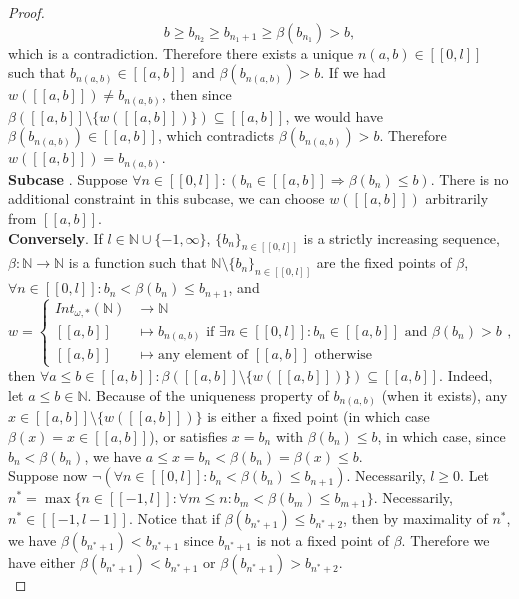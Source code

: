 \documentclass[a4paper,11pt]{article}
\newcommand*\circled[1]{\tikz[baseline=(char.base)]{
            \node[shape=circle,draw,inner sep=2pt] (char) {#1};}}
\theoremstyle{plain}
\theoremstyle{definition}
\theoremstyle{remark}
\begin{document}
\begin{proof}
\[ b \geq b_{n_2} \geq b_{n_1 + 1} \geq \beta(b_{n_1}) > b, \]
which is a contradiction. Therefore there exists a unique $n(a,b) \in [\![0,l]\!]$ such that $b_{n(a,b)} \in [\![a,b]\!] \text{ and } \beta(b_{n(a,b)}) > b$. If we had $w([\![a,b]\!]) \neq b_{n(a,b)}$, then since $\beta([\![a,b]\!]\setminus \{w([\![a,b]\!])\}) \subseteq [\![a,b]\!]$, we would have $\beta(b_{n(a,b)}) \in [\![a,b]\!]$, which contradicts $\beta(b_{n(a,b)}) > b$. Therefore $w([\![a,b]\!]) = b_{n(a,b)}$. \\
\textbf{Subcase \circled{1.2}}. Suppose $\forall n \in [\![0,l]\!] : (b_n \in [\![a,b]\!] \Rightarrow \beta(b_n) \leq b)$. There is no additional constraint in this subcase, we can choose $w([\![a,b]\!])$ arbitrarily from $[\![a,b]\!]$. \\
\textbf{Conversely}. If $l \in \mathbb{N} \cup \{-1, \infty\}$, $\{b_n\}_{n \in [\![0,l]\!]}$ is a strictly increasing sequence, $\beta : \mathbb{N} \to \mathbb{N}$ is a function such that $\mathbb{N} \setminus \{b_n\}_{n \in [\![0,l]\!]}$ are the fixed points of $\beta$, $\forall n \in [\![0,l]\!] : b_n < \beta(b_n) \leq b_{n+1}$, and 
\[ w = \begin{cases} Int_{\omega,*}(\mathbb{N}) &\to \mathbb{N} \\ [\![a,b]\!] &\mapsto b_{n(a,b)} \text { if } \exists n \in [\![0,l]\!] : b_n \in [\![a,b]\!] \text{ and } \beta(b_n) > b \\ [\![a,b]\!] &\mapsto \text{any element of } [\![a,b]\!] \text{ otherwise} \end{cases}, \]
then $\forall a \leq b \in [\![a,b]\!] : \beta([\![a,b]\!] \setminus \{w([\![a,b]\!])\}) \subseteq [\![a,b]\!]$. Indeed, let $a \leq b \in \mathbb{N}$. Because of the uniqueness property of $b_{n(a,b)}$ (when it exists), any $x \in [\![a,b]\!] \setminus \{w([\![a,b]\!])\}$ is either a fixed point (in which case $\beta(x) = x \in [\![a,b]\!]$), or satisfies $x = b_n$ with $\beta(b_n) \leq b$, in which case, since $b_n < \beta(b_n)$, we have $a \leq x =  b_n < \beta(b_n) = \beta(x) \leq b$. \\

\noindent Suppose now $\neg \left( \forall n \in [\![0,l]\!] : b_n < \beta(b_n) \leq b_{n+1} \right)$. Necessarily, $l \geq 0$. Let $n^* = \max \{ n \in [\![-1,l]\!] : \forall m \leq n : b_m < \beta(b_m) \leq b_{m+1} \}$. Necessarily, $n^* \in [\![-1,l-1]\!]$. Notice that if $\beta(b_{n^* +1}) \leq b_{n^*+2}$, then by maximality of $n^*$, we have $\beta(b_{n^*+1}) < b_{n^*+1}$ since $b_{n^*+1}$ is not a fixed point of $\beta$. Therefore we have either $\beta(b_{n^*+1}) < b_{n^*+1}$ or $\beta(b_{n^*+1}) > b_{n^*+2}$. \\


\end{proof}
\end{document}
